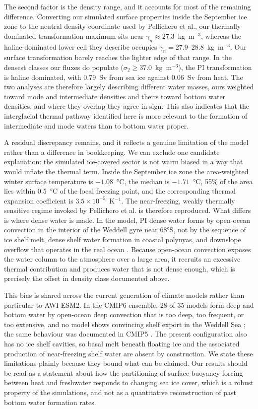 \documentclass[pdflatex,sn-nature]{sn-jnl}
\begin{document}
The second factor is the density range, and it accounts for most of the remaining difference. Converting our simulated surface properties inside the September ice zone to the neutral density coordinate used by Pellichero et al., our thermally dominated transformation maximum sits near $\gamma_n \approx 27.3$~kg~m$^{-3}$, whereas the haline-dominated lower cell they describe occupies $\gamma_n = 27.9$--$28.8$~kg~m$^{-3}$. Our surface transformation barely reaches the lighter edge of that range. In the densest classes our fluxes do populate ($\sigma_2 \ge 37.0$~kg~m$^{-3}$), the PI transformation is haline dominated, with 0.79~Sv from sea ice against 0.06~Sv from heat. The two analyses are therefore largely describing different water masses, ours weighted toward mode and intermediate densities and theirs toward bottom water densities, and where they overlap they agree in sign. This also indicates that the interglacial thermal pathway identified here is more relevant to the formation of intermediate and mode waters than to bottom water proper.

A residual discrepancy remains, and it reflects a genuine limitation of the model rather than a difference in bookkeeping. We can exclude one candidate explanation: the simulated ice-covered sector is not warm biased in a way that would inflate the thermal term. Inside the September ice zone the area-weighted winter surface temperature is $-1.08$~°C, the median is $-1.71$~°C, 55\% of the area lies within 0.5~°C of the local freezing point, and the corresponding thermal expansion coefficient is $3.5\times10^{-5}$~K$^{-1}$. The near-freezing, weakly thermally sensitive regime invoked by Pellichero et al. is therefore reproduced. What differs is where dense water is made. In the model, PI dense water forms by open-ocean convection in the interior of the Weddell gyre near 68°S, not by the sequence of ice shelf melt, dense shelf water formation in coastal polynyas, and downslope overflow that operates in the real ocean \cite{Orsi1999,ToggweilerSamuels1995}. Because open-ocean convection exposes the water column to the atmosphere over a large area, it recruits an excessive thermal contribution and produces water that is not dense enough, which is precisely the offset in density class documented above.

This bias is shared across the current generation of climate models rather than particular to AWI-ESM2. In the CMIP6 ensemble, 28 of 35 models form deep and bottom water by open-ocean deep convection that is too deep, too frequent, or too extensive, and no model shows convincing shelf export in the Weddell Sea \cite{Heuze2021}; the same behaviour was documented in CMIP5 \cite{Heuze2013}. The present configuration also has no ice shelf cavities, so basal melt beneath floating ice and the associated production of near-freezing shelf water are absent by construction. We state these limitations plainly because they bound what can be claimed. Our results should be read as a statement about how the partitioning of surface buoyancy forcing between heat and freshwater responds to changing sea ice cover, which is a robust property of the simulations, and not as a quantitative reconstruction of past bottom water formation rates.
\end{document}
